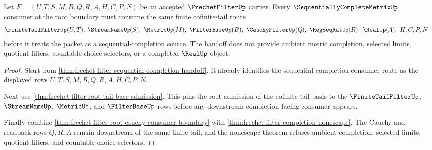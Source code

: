 \begin{theorem}
\label{thm:frechet-filter-root-sequential-completion-handoff}
Let $F=(U,T,S,M,B,Q,R,A,H,C,P,N)$ be an accepted $\FrechetFilterUp$ carrier. Every $\SequentiallyCompleteMetricUp$ consumer at the root boundary must consume the same finite cofinite-tail route
$$
\FiniteTailFilterUp(U,T),\ \StreamNameUp(S),\ \MetricUp(M),\ \FilterBaseUp(B),\ \CauchyFilterUp(Q),\ \RegSeqRatUp(R),\ \RealUp(A),\ H,C,P,N
$$
before it treats the packet as a sequential-completion source. The handoff does not provide ambient metric completion, selected limits, quotient filters, countable-choice selectors, or a completed $\RealUp$ object.
\end{theorem}
\begin{proof}
Start from \autoref{thm:frechet-filter-sequential-completion-handoff}. It already identifies the sequential-completion consumer route as the displayed rows $U,T,S,M,B,Q,R,A,H,C,P,N$.

Next use \autoref{thm:frechet-filter-root-tail-base-admission}. This pins the root admission of the cofinite-tail basis to the $\FiniteTailFilterUp$, $\StreamNameUp$, $\MetricUp$, and $\FilterBaseUp$ rows before any downstream completion-facing consumer appears.

Finally combine \autoref{thm:frechet-filter-root-cauchy-consumer-boundary} with \autoref{thm:frechet-filter-completion-nonescape}. The Cauchy and readback rows $Q,R,A$ remain downstream of the same finite tail, and the nonescape theorem refuses ambient completion, selected limits, quotient filters, and countable-choice selectors.
\end{proof}

